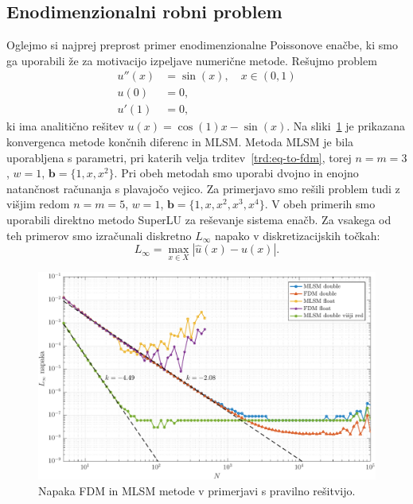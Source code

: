 \documentclass[12pt,a4paper,twoside]{article}
\theoremstyle{definition} %
\theoremstyle{plain} %
\numberwithin{equation}{section}
\renewcommand{\b}{\boldsymbol}
\newlength{\iw}
\begin{document}
\subsection{Enodimenzionalni robni problem}
Oglejmo si najprej preprost primer enodimenzionalne Poissonove enačbe, ki smo ga uporabili že za
motivacijo izpeljave numerične metode.
Rešujmo problem
\begin{align*}
  u''(x) &= \sin(x), \quad x \in (0, 1) \\
  u(0) &= 0, \\
  u'(1) &= 0,
\end{align*}
ki ima analitično rešitev $u(x) = \cos(1) x - \sin(x)$.
Na sliki~\ref{fig:mlsm-fdm-err} je prikazana konvergenca metode končnih diferenc
in MLSM. Metoda MLSM je bila uporabljena s parametri, pri katerih velja
trditev~\ref{trd:eq-to-fdm}, torej $n=m=3$, $w=1$, $\b b = \{1, x, x^2\}$.
Pri obeh metodah smo uporabi dvojno in enojno natančnost računanja s plavajočo
vejico.  Za primerjavo smo rešili problem tudi z višjim redom $n=m=5$, $w=1$,
$\b b = \{1, x, x^2, x^3, x^4\}$. V obeh primerih smo uporabili direktno metodo
SuperLU za reševanje sistema enačb. Za vsakega od teh primerov smo izračunali
diskretno $L_\infty$ napako v diskretizacijskih točkah: \[ L_\infty = \max_{x\in
X} |\hat{u}(x) - u(x)|.  \]

\begin{figure}[h]
  \centering
  \includegraphics[width=\iw]{images/lap1d_convergence.pdf}
  \caption{Napaka FDM in MLSM metode v primerjavi s pravilno rešitvijo.}
  \label{fig:mlsm-fdm-err}
\end{figure}
\end{document}
